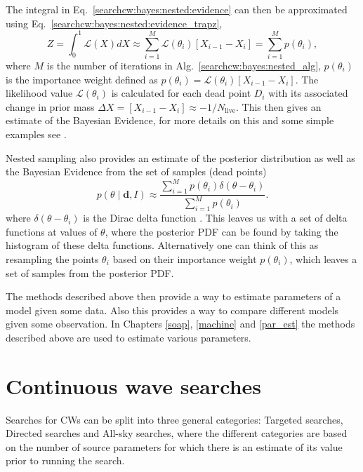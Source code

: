 The integral in Eq.~\ref{searchcw:bayes:nested:evidence} can then be approximated using Eq.~\ref{searchcw:bayes:nested:evidence_trapz},
\begin{equation}
\label{searchcw:bayes:nested:approx_evidence}
	Z = \int_0^1 \mathcal{L}(X) dX \approx \sum_{i=1}^{M}  \mathcal{L}(\theta_i)  \left[ X_{i-1} - X_{i} \right] = \sum_{i=1}^{M} p(\theta_i),
\end{equation}
where $M$ is the number of iterations in Alg.~\ref{searchcw:bayes:nested_alg}, $p(\theta_i)$ is the importance weight defined as $p(\theta_i) =  \mathcal{L}(\theta_i) \left[ X_{i-1} - X_{i} \right]$. The likelihood value $\mathcal{L}(\theta_i)$ is calculated for each dead point $D_i$ with its associated change in prior mass $\Delta X = \left[ X_{i-1} - X_{i} \right] \approx -1/N_{\text{live}}$. 
This then gives an estimate of the Bayesian Evidence, for more details on this and some simple examples see \citep{skilling2006NestedSampling,speagle2019DynestyDynamic,feroz2019ImportanceNested}.

Nested sampling also provides an estimate of the posterior distribution as well as the Bayesian Evidence from the set of samples (dead points) 
\begin{equation}
	p(\theta \mid \bm{d}, I) \approx \frac{\sum_{i=1}^{M} p(\theta_i) \delta(\theta - \theta_i)}{\sum_{i=1}^{M} p(\theta_i) }.
\end{equation}
where $\delta( \theta - \theta_i)$ is the Dirac delta
function \citep{speagle2019DynestyDynamic}. This leaves us with a set of delta functions at values of $\theta$, where the posterior \gls{PDF} can be found by taking the histogram of these delta functions.
Alternatively one can think of this as resampling the points $\theta_i$ based on their importance weight $p(\theta_i)$, which leaves a set of samples from the posterior \gls{PDF}.

The methods described above then provide a way to estimate parameters of a
model given some data.  Also this provides a way to compare different models
given some observation.  In Chapters \ref{soap}, \ref{machine} and
\ref{par_est} the methods described above are used to estimate various
parameters.

\section{\label{searchcw:search} Continuous wave searches}

Searches for \glspl{CW} can be split into three general categories: Targeted
searches, Directed searches and All-sky searches, where the different
categories are based on the number of source parameters for which there is an estimate of its value prior to running the search.

